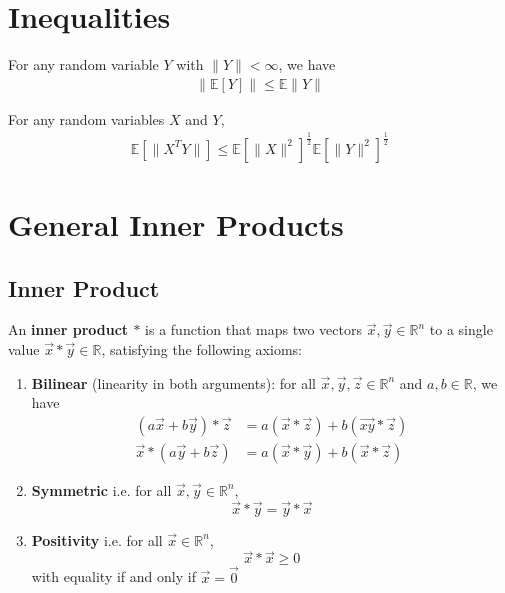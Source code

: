 \documentclass[11pt]{elegantbook}
\begin{document}
\section{Inequalities}
\begin{proposition}
    For any random variable $Y$ with $\|Y\|<\infty$, we have
    \begin{equation}
        \begin{aligned}
            \|\mathbb{E}[Y]\| \leq \mathbb{E}\|Y\|
        \end{aligned}
        \nonumber
    \end{equation}
\end{proposition}

\begin{proposition}
    For any random variables $X$ and $Y$,
    \begin{equation}
        \begin{aligned}
            \mathbb{E}[\|X^TY\|]\leq \mathbb{E}[\|X\|^2]^{\frac{1}{2}}\mathbb{E}[\|Y\|^2]^{\frac{1}{2}}
        \end{aligned}
        \nonumber
    \end{equation}
\end{proposition}

\section{General Inner Products}
\subsection{ Inner Product}
\begin{definition}\end{definition}
An \textbf{inner product $*$} is a function that maps two vectors $\vec{x},\vec{y}\in \mathbb{R}^n$ to a single value $\vec{x}*\vec{y}\in \mathbb{R}$, satisfying the following axioms:
\begin{enumerate}
    \item \textbf{Bilinear} (linearity in both arguments): for all $\vec{x},\vec{y},\vec{z}\in \mathbb{R}^n$ and $a,b\in \mathbb{R}$, we have
    \begin{equation}
        \begin{aligned}
            (a \vec{x}+ b\vec{y})*\vec{z}&=a(\vec{x}*\vec{z})+b(\vec{xy}*\vec{z})\\
            \vec{x}*(a \vec{y}+b \vec{z})&=a(\vec{x}* \vec{y})+ b(\vec{x}* \vec{z})
        \end{aligned}
        \nonumber
    \end{equation}
    \item \textbf{Symmetric} i.e. for all $\vec{x},\vec{y}\in \mathbb{R}^n$, $$\vec{x}* \vec{y}=\vec{y}* \vec{x}$$
    \item \textbf{Positivity} i.e. for all $\vec{x}\in \mathbb{R}^n$, $$\vec{x}* \vec{x}\geq 0$$ with equality if and only if $\vec{x}=\vec{0}$
\end{enumerate}
\end{document}
